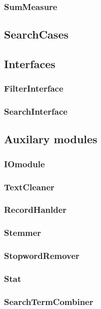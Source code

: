 \subsubsection{SumMeasure}


\subsection*{SearchCases}


\subsection*{Interfaces}
\subsubsection{FilterInterface}

\subsubsection{SearchInterface}


\subsection*{Auxilary modules}
\subsubsection{IOmodule}

\subsubsection{TextCleaner}

\subsubsection{RecordHanlder}

\subsubsection{Stemmer}

\subsubsection{StopwordRemover}

\subsubsection{Stat}

\subsubsection{SearchTermCombiner}

